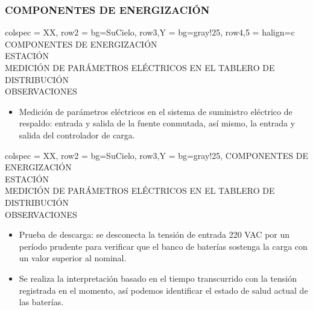 \subsubsection{COMPONENTES DE ENERGIZACIÓN}
\begin{tblr}{
        colspec = {XX},
        row{2} = {bg=SuCielo},
        row{3,Y} = {bg=gray!25},
        row{4,5} = {halign=c}
    }
     COMPONENTES DE ENERGIZACIÓN \\
     ESTACIÓN \MakeUppercase{} \\
     MEDICIÓN DE PARÁMETROS ELÉCTRICOS EN EL TABLERO DE DISTRIBUCIÓN \\
     OBSERVACIONES \\
     \begin{itemize}
        \item Medición de parámetros eléctricos en el sistema de suministro eléctrico de respaldo: entrada y salida de la fuente conmutada, así mismo, la entrada y salida del controlador de carga.
    \end{itemize}
\end{tblr}
\newpage
\begin{tblr}{
        colspec = {XX},
        row{2} = {bg=SuCielo},
        row{3,Y} = {bg=gray!25},
    }
     COMPONENTES DE ENERGIZACIÓN \\
     ESTACIÓN \MakeUppercase{} \\
     MEDICIÓN DE PARÁMETROS ELÉCTRICOS EN EL TABLERO DE DISTRIBUCIÓN \\
     OBSERVACIONES \\
     \begin{itemize}
        \item Prueba de descarga: se desconecta la tensión de entrada 220 VAC por un período prudente para verificar que el banco de baterías sostenga la carga con un valor superior al nominal.
        \item Se realiza la interpretación basado en el tiempo transcurrido con la tensión registrada en el momento, así podemos identificar el estado de salud actual de las baterías.
    \end{itemize}
\end{tblr}

